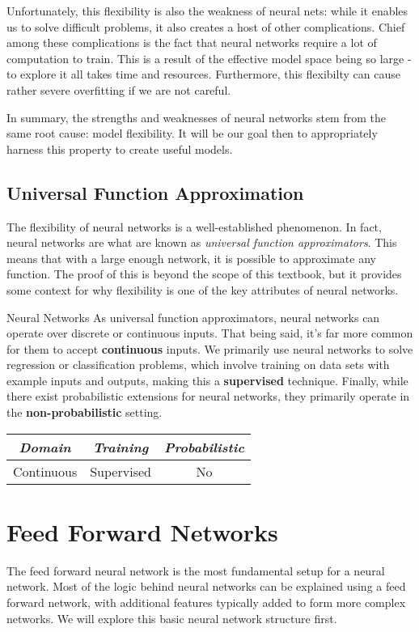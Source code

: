 Unfortunately, this flexibility is also the weakness of neural nets: while it enables us to solve difficult problems, it also creates a host of other complications. Chief among these complications is the fact that neural networks require a lot of computation to train. This is a result of the effective model space being so large - to explore it all takes time and resources. Furthermore, this flexibilty can cause rather severe overfitting if we are not careful.

In summary, the strengths and weaknesses of neural networks stem from the same root cause: model flexibility. It will be our goal then to appropriately harness this property to create useful models.

\subsection{Universal Function Approximation}
The flexibility of neural networks is a well-established phenomenon. In fact, neural networks are what are known as \textit{universal function approximators}. This means that with a large enough network, it is possible to approximate any function. The proof of this is beyond the scope of this textbook, but it provides some context for why flexibility is one of the key attributes of neural networks.

\begin{mlcube}{Neural Networks}
As universal function approximators, neural networks can operate over discrete or continuous inputs. That being said, it's far more common for them to accept \textbf{continuous} inputs. We primarily use neural networks to solve regression or classification problems, which involve training on data sets with example inputs and outputs, making this a \textbf{supervised} technique. Finally, while there exist probabilistic extensions for neural networks, they primarily operate in the \textbf{non-probabilistic} setting.
\begin{center}
    \begin{tabular}{c|c|c}
    \textit{\textbf{Domain}} & \textit{\textbf{Training}} & \textit{\textbf{Probabilistic}} \\
    \hline
    Continuous & Supervised & No \\
    \end{tabular}
\end{center}
\end{mlcube}

\section{Feed Forward Networks}
The feed forward neural network is the most fundamental setup for a neural network. Most of the logic behind neural networks can be explained using a feed forward network, with additional features typically added to form more complex networks. We will explore this basic neural network structure first.

